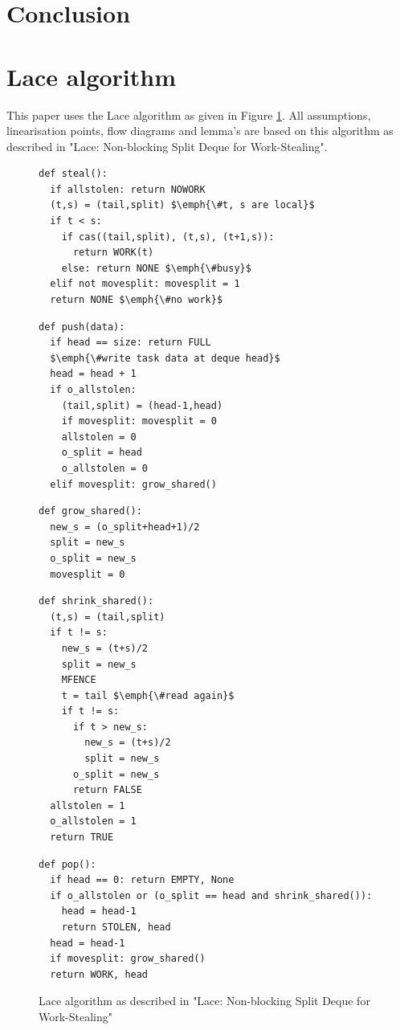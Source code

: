 \documentclass{sig-alternate-br}
\begin{document}
\section{Conclusion}




\appendix
\section{Lace algorithm}
This paper uses the Lace algorithm as given in Figure \ref{fig:Lace}.
All assumptions, linearisation points, flow diagrams and lemma's are based on this algorithm as described in "Lace: Non-blocking Split Deque for Work-Stealing"\cite{vanDijk2014206}.
\begin{figure}
\begin{lstlisting}
def steal():
  if allstolen: return NOWORK
  (t,s) = (tail,split) $\emph{\#t, s are local}$
  if t < s:
    if cas((tail,split), (t,s), (t+1,s)):
      return WORK(t)
    else: return NONE $\emph{\#busy}$
  elif not movesplit: movesplit = 1
  return NONE $\emph{\#no work}$
\end{lstlisting}
\begin{lstlisting}[firstnumber=10]
def push(data):
  if head == size: return FULL
  $\emph{\#write task data at deque head}$
  head = head + 1
  if o_allstolen:
    (tail,split) = (head-1,head)
    if movesplit: movesplit = 0
    allstolen = 0
    o_split = head
    o_allstolen = 0
  elif movesplit: grow_shared()
\end{lstlisting}
\begin{lstlisting}[firstnumber=21]
def grow_shared():
  new_s = (o_split+head+1)/2
  split = new_s
  o_split = new_s
  movesplit = 0
\end{lstlisting}
\begin{lstlisting}[firstnumber=26]
def shrink_shared():
  (t,s) = (tail,split)
  if t != s:
    new_s = (t+s)/2
    split = new_s
    MFENCE
    t = tail $\emph{\#read again}$
    if t != s:
      if t > new_s:
        new_s = (t+s)/2
        split = new_s
      o_split = new_s
      return FALSE
  allstolen = 1
  o_allstolen = 1
  return TRUE
\end{lstlisting}
\begin{lstlisting}[firstnumber=42]
def pop():
  if head == 0: return EMPTY, None
  if o_allstolen or (o_split == head and shrink_shared()):
    head = head-1
    return STOLEN, head
  head = head-1
  if movesplit: grow_shared()
  return WORK, head
\end{lstlisting}
\caption{Lace algorithm as described in "Lace: Non-blocking Split Deque for Work-Stealing"\cite{vanDijk2014206}}
\label{fig:Lace}
\end{figure}
\end{document}
